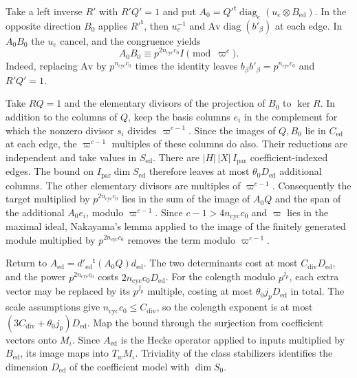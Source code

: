 Take a left inverse \(R'\) with \(R'Q'=1\) and put
\(A_0=Q'^{\mathsf t}\operatorname{diag}_e(u_e\otimes B_\mathrm{ed})\).
In the opposite direction \(B_0\) applies \(R'^{\mathsf t}\), then
\(u_e^{-1}\) and \(\mathrm{Av}\operatorname{diag}(b'_\beta)\) at
each edge. In \(A_0B_0\) the \(u_e\) cancel, and the congruence yields
\[
 A_0 B_0\equiv p^{2n_\mathrm{cyc}c_0}I\pmod{\varpi^c}.
\]
Indeed, replacing \(\mathrm{Av}\) by \(p^{n_\mathrm{cyc}c_0}\) times
the identity leaves \(b_\beta b'_\beta=p^{n_\mathrm{cyc}c_0}\)
and \(R'Q'=1\).

Take \(R Q=1\) and the elementary divisors of the projection of
\(B_0\) to \(\ker R\). In addition to the columns of \(Q\), keep
the basis columns \(e_i\) in the complement for which the nonzero
divisor \(s_i\) divides \(\varpi^{c-1}\).
Since the images of \(Q,B_0\) lie in \(C_\mathrm{ed}\) at each edge,
the \(\varpi^{c-1}\) multiples of these columns do also.
Their reductions are independent and take values in \(S_\mathrm{ed}\).
There are \(|H|\,|X|\,I_\mathrm{par}\) coefficient-indexed edges.
The bound on \(I_\mathrm{par}\dim S_\mathrm{ed}\) therefore leaves at most
\(\theta_0D_\mathrm{ed}\) additional columns.
The other elementary divisors are multiples of \(\varpi^{c-1}\).
Consequently the target multiplied by \(p^{2n_\mathrm{cyc}c_0}\) lies
in the sum of the image of \(A_0Q\) and the span of the additional
\(A_0e_i\), modulo \(\varpi^{c-1}\).
Since \(c-1>4n_\mathrm{cyc}c_0\) and \(\varpi\) lies in the maximal
ideal, Nakayama's lemma applied to the image of the finitely
generated module multiplied by \(p^{2n_\mathrm{cyc}c_0}\) removes
the term modulo \(\varpi^{c-1}\).

Return to \(A_\mathrm{ed}=d'_\mathrm{ed}{}^{\mathsf t}(A_0Q)d_\mathrm{ed}\).
The two determinants cost at most \(C_{\mathrm{div}}D_\mathrm{ed}\),
and the power \(p^{2n_\mathrm{cyc}c_0}\) costs \(2n_\mathrm{cyc}c_0D_\mathrm{ed}\).
For the colength modulo \(p^{j_p}\), each extra vector may be
replaced by its \(p^{j_p}\) multiple, costing at most
\(\theta_0j_pD_\mathrm{ed}\) in total.
The scale assumptions give \(n_\mathrm{cyc}c_0\le C_{\mathrm{div}}\),
so the colength exponent is at most
\((3C_{\mathrm{div}}+\theta_0j_p)D_\mathrm{ed}\).
Map the bound through the surjection from coefficient vectors onto
\(M_\iota\). Since \(A_\mathrm{ed}\) is the Hecke operator applied to
inputs multiplied by \(B_\mathrm{ed}\), its image maps into
\(T_w M_\iota\). Triviality of the class stabilizers identifies the
dimension \(D_\mathrm{ed}\) of the coefficient model with \(\dim S_0\).

